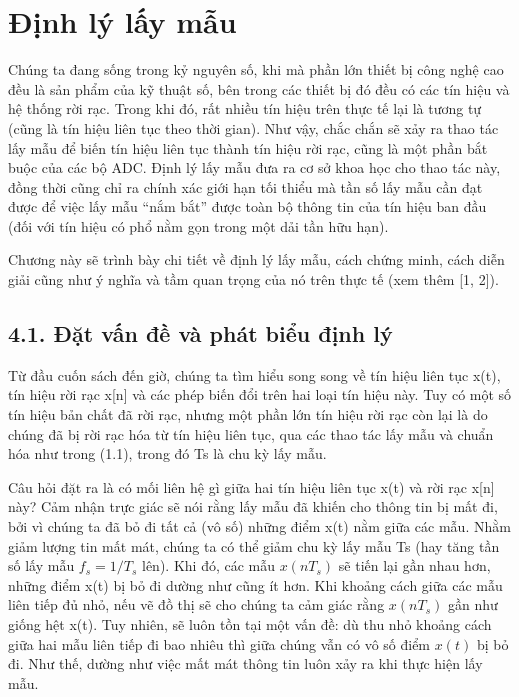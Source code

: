 \documentclass[
  10
]{article}
\begin{document}
\section{Định lý lấy mẫu}\label{ux111ux1ecbnh-luxfd-lux1ea5y-mux1eabu}

Chúng ta đang sống trong kỷ nguyên số, khi mà phần lớn thiết bị công
nghệ cao đều là sản phẩm của kỹ thuật số, bên trong các thiết bị đó đều
có các tín hiệu và hệ thống rời rạc. Trong khi đó, rất nhiều tín hiệu
trên thực tế lại là tương tự (cũng là tín hiệu liên tục theo thời gian).
Như vậy, chắc chắn sẽ xảy ra thao tác lấy mẫu để biến tín hiệu liên tục
thành tín hiệu rời rạc, cũng là một phần bắt buộc của các bộ ADC. Định
lý lấy mẫu đưa ra cơ sở khoa học cho thao tác này, đồng thời cũng chỉ ra
chính xác giới hạn tối thiểu mà tần số lấy mẫu cần đạt được để việc lấy
mẫu ``nắm bắt'' được toàn bộ thông tin của tín hiệu ban đầu (đối với tín
hiệu có phổ nằm gọn trong một dải tần hữu hạn).

Chương này sẽ trình bày chi tiết về định lý lấy mẫu, cách chứng minh,
cách diễn giải cũng như ý nghĩa và tầm quan trọng của nó trên thực tế
(xem thêm {[}1, 2{]}).

\subsection{4.1. Đặt vấn đề và phát biểu định
lý}\label{ux111ux1eb7t-vux1ea5n-ux111ux1ec1-vuxe0-phuxe1t-biux1ec3u-ux111ux1ecbnh-luxfd}

Từ đầu cuốn sách đến giờ, chúng ta tìm hiểu song song về tín hiệu liên
tục x(t), tín hiệu rời rạc x{[}n{]} và các phép biến đổi trên hai loại
tín hiệu này. Tuy có một số tín hiệu bản chất đã rời rạc, nhưng một phần
lớn tín hiệu rời rạc còn lại là do chúng đã bị rời rạc hóa từ tín hiệu
liên tục, qua các thao tác lấy mẫu và chuẩn hóa như trong (1.1), trong
đó Ts là chu kỳ lấy mẫu.

Câu hỏi đặt ra là có mối liên hệ gì giữa hai tín hiệu liên tục x(t) và
rời rạc x{[}n{]} này? Cảm nhận trực giác sẽ nói rằng lấy mẫu đã khiến
cho thông tin bị mất đi, bởi vì chúng ta đã bỏ đi tất cả (vô số) những
điểm x(t) nằm giữa các mẫu. Nhằm giảm lượng tin mất mát, chúng ta có thể
giảm chu kỳ lấy mẫu Ts (hay tăng tần số lấy mẫu
\(f _ { s } = 1 / T _ { s }\) lên). Khi đó, các mẫu
\(x ( n T _ { s } )\) sẽ tiến lại gần nhau hơn, những điểm x(t) bị bỏ đi
dường như cũng ít hơn. Khi khoảng cách giữa các mẫu liên tiếp đủ nhỏ,
nếu vẽ đồ thị sẽ cho chúng ta cảm giác rằng \(x ( n T _ { s } )\) gần
như giống hệt x(t). Tuy nhiên, sẽ luôn tồn tại một vấn đề: dù thu nhỏ
khoảng cách giữa hai mẫu liên tiếp đi bao nhiêu thì giữa chúng vẫn có vô
số điểm \(x ( t )\) bị bỏ đi. Như thế, dường như việc mất mát thông tin
luôn xảy ra khi thực hiện lấy mẫu.
\end{document}
